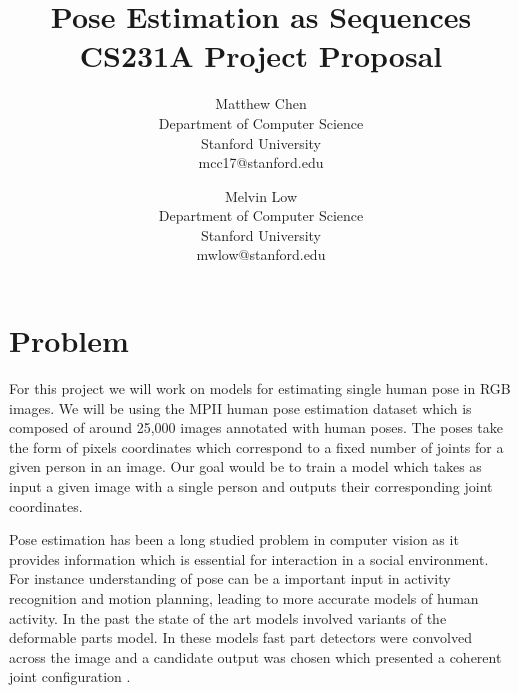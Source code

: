 \documentclass[12pt]{article}
\begin{document}
\title{Pose Estimation as Sequences \\ \small CS231A Project Proposal}
\author{Matthew Chen\\
  \small \vspace{-2mm} Department of Computer Science\\
  \small \vspace{-2mm} Stanford University\\
  \small mcc17@stanford.edu
  \and
  Melvin Low\\
  \small \vspace{-2mm} Department of Computer Science\\
  \small \vspace{-2mm} Stanford University\\
  \small mwlow@stanford.edu}

\date{}
\maketitle

\section{Problem}

For this project we will work on models for estimating single human pose in RGB images. We will be using the MPII human pose estimation dataset which is composed of around 25,000 images annotated with human poses. The poses take the form of pixels coordinates which correspond to a fixed number of joints for a given person in an image. Our goal would be to train a model which takes as input a given image with a single person and outputs their corresponding joint coordinates.

Pose estimation has been a long studied problem in computer vision as it provides information which is essential for interaction in a social environment. For instance understanding of pose can be a important input in activity recognition and motion planning, leading to more accurate models of human activity. In the past the state of the art models involved variants of the deformable parts model. In these models fast part detectors were convolved across the image and a candidate output was chosen which presented a coherent joint configuration \cite{felzenszwalb2010object}.
\end{document}
